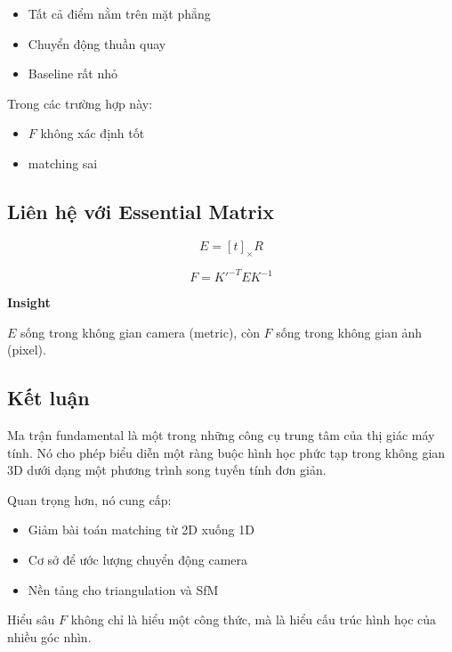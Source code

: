 \begin{itemize}
	\item Tất cả điểm nằm trên mặt phẳng
	\item Chuyển động thuần quay
	\item Baseline rất nhỏ
\end{itemize}

Trong các trường hợp này:
\begin{itemize}
	\item $F$ không xác định tốt
	\item matching sai
\end{itemize}

\subsection{Liên hệ với Essential Matrix}
\label{subsec:essential_relation}

\[
E = [t]_\times R
\]

\[
F = K'^{-T} E K^{-1}
\]

\begin{mdframed}[style=infobox]
	\textbf{Insight}
	
	$E$ sống trong không gian camera (metric), còn $F$ sống trong không gian ảnh (pixel).
\end{mdframed}

\subsection{Kết luận}
\label{subsec:F_conclusion}

Ma trận fundamental là một trong những công cụ trung tâm của thị giác máy tính. Nó cho phép biểu diễn một ràng buộc hình học phức tạp trong không gian 3D dưới dạng một phương trình song tuyến tính đơn giản.

Quan trọng hơn, nó cung cấp:

\begin{itemize}
	\item Giảm bài toán matching từ 2D xuống 1D
	\item Cơ sở để ước lượng chuyển động camera
	\item Nền tảng cho triangulation và SfM
\end{itemize}

Hiểu sâu $F$ không chỉ là hiểu một công thức, mà là hiểu cấu trúc hình học của nhiều góc nhìn.